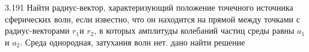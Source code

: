 \testCom
{%
	3.191
}
{%
	Найти радиус-вектор, характеризующий положение точечного источника сферических волн, если известно, что он находится на прямой между точками с радиус-векторами ${r}_{1} $и ${r}_{2}$, в которых амплитуды колебаний частиц среды равны  ${a}_{1}$ и ${a}_{2}$. Среда однородная, затухания волн нет. 
}
{%
	дано
}
{%
	найти
}
{%
	решение
}


